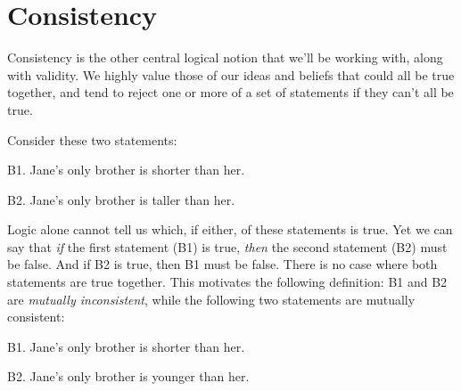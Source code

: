 \documentclass[PHIL101-Textbook.tex]{subfiles}
\begin{document}


\section{Consistency}
Consistency is the other central logical notion that we'll be working with, along with validity. We highly value those of our ideas and beliefs that could all be true together, and tend to reject one or more of a set of statements if they can't all be true.

Consider these two statements:
	\begin{ebullet}
		\item[B1.] Jane's only brother is shorter than her.
		\item[B2.] Jane's only brother is taller than her.
	\end{ebullet}
Logic alone cannot tell us which, if either, of these statements is true. Yet we can say that \emph{if} the first statement (B1) is true, \emph{then} the second statement (B2) must be false. And if B2 is true, then B1 must be false. There is no case where both statements are true together. This motivates the following definition:
B1 and B2 are \emph{mutually inconsistent}, while the following two statements are mutually consistent:
	\begin{ebullet}
		\item[B1.] Jane's only brother is shorter than her.
		\item[B2.] Jane's only brother is younger than her.
	\end{ebullet}
\end{document}
